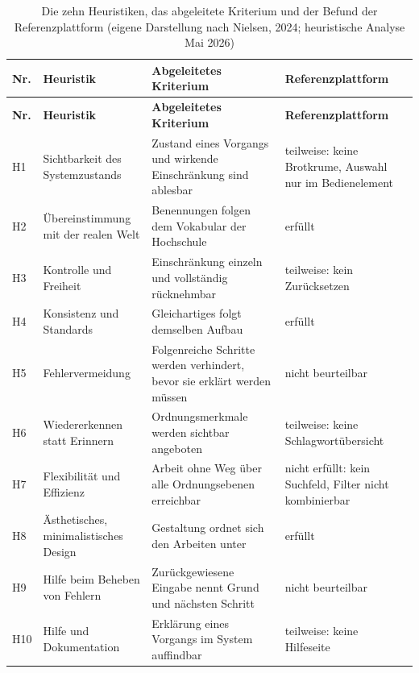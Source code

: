 \begingroup
\footnotesize
\setlength{\tabcolsep}{4pt}
\renewcommand{\arraystretch}{1.05}
\setlength{\LTcapwidth}{\textwidth}
\begin{longtable}{@{}L{0.9cm}L{3.6cm}L{6.6cm}L{3.3cm}@{}}
	\caption[Die zehn Heuristiken, das abgeleitete Kriterium und der Befund der Referenzplattform]{Die zehn Heuristiken, das abgeleitete Kriterium und der Befund der Referenzplattform (eigene Darstellung nach Nielsen, 2024; heuristische Analyse Mai 2026)}
	\label{tab:heuristiken}\\
	\toprule
	\textbf{Nr.} & \textbf{Heuristik} & \textbf{Abgeleitetes Kriterium} & \textbf{Referenzplattform} \\
	\midrule
	\endfirsthead
	\toprule
	\textbf{Nr.} & \textbf{Heuristik} & \textbf{Abgeleitetes Kriterium} & \textbf{Referenzplattform} \\
	\midrule
	\endhead
	\bottomrule
	\endfoot
	H1 & Sichtbarkeit des Systemzustands & Zustand eines Vorgangs und wirkende Einschränkung sind ablesbar & teilweise: keine Brotkrume, Auswahl nur im Bedienelement \\
	H2 & Übereinstimmung mit der realen Welt & Benennungen folgen dem Vokabular der Hochschule & erfüllt \\
	H3 & Kontrolle und Freiheit & Einschränkung einzeln und vollständig rücknehmbar & teilweise: kein Zurücksetzen \\
	H4 & Konsistenz und Standards & Gleichartiges folgt demselben Aufbau & erfüllt \\
	H5 & Fehlervermeidung & Folgenreiche Schritte werden verhindert, bevor sie erklärt werden müssen & nicht beurteilbar \\
	H6 & Wiedererkennen statt Erinnern & Ordnungsmerkmale werden sichtbar angeboten & teilweise: keine Schlagwortübersicht \\
	H7 & Flexibilität und Effizienz & Arbeit ohne Weg über alle Ordnungsebenen erreichbar & nicht erfüllt: kein Suchfeld, Filter nicht kombinierbar \\
	H8 & Ästhetisches, minimalistisches Design & Gestaltung ordnet sich den Arbeiten unter & erfüllt \\
	H9 & Hilfe beim Beheben von Fehlern & Zurückgewiesene Eingabe nennt Grund und nächsten Schritt & nicht beurteilbar \\
	H10 & Hilfe und Dokumentation & Erklärung eines Vorgangs im System auffindbar & teilweise: keine Hilfeseite \\
\end{longtable}
\endgroup

